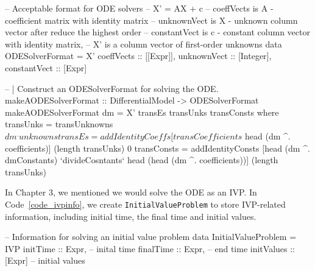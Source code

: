 \begin{listing}
\begin{haskell1}
-- Acceptable format for ODE solvers
-- X' = AX + c
-- coeffVects is A - coefficient matrix with identity matrix
-- unknownVect is X - unknown column vector after reduce the highest order
-- constantVect is c - constant column vector with identity matrix, 
-- X' is a column vector of first-order unknowns
data ODESolverFormat = X'{
  coeffVects :: [[Expr]],
  unknownVect :: [Integer],
  constantVect :: [Expr]
}

-- | Construct an ODESolverFormat for solving the ODE.
makeAODESolverFormat :: DifferentialModel -> ODESolverFormat
makeAODESolverFormat dm = X' transEs transUnks transConsts
  where transUnks = transUnknowns $ dm ^. unknowns
        transEs = addIdentityCoeffs [transCoefficients $ head (dm ^. coefficients)] (length transUnks) 0
        transConsts = addIdentityConsts [head (dm ^. dmConstants) `divideCosntants` head (head (dm ^. coefficients))] (length transUnks)
\end{haskell1}
\label{code_odesolverformat}
\end{listing}

In Chapter 3, we mentioned we would solve the ODE as an IVP. In Code~\ref{code_ivpinfo}, we create \verb|InitialValueProblem| to store IVP-related information, including initial time, the final time and initial values.
\begin{listing}
\begin{haskell1}
-- Information for solving an initial value problem
data InitialValueProblem = IVP{
  initTime :: Expr, -- inital time
  finalTime :: Expr, -- end time
  initValues :: [Expr] -- initial values
}
\end{haskell1}
\label{code_ivpinfo}
\end{listing}

